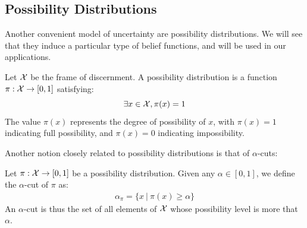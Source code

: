 \subsection{Possibility Distributions}\label{sec:possibilities}
Another convenient model of uncertainty are possibility distributions. We will see that they induce a particular type of belief functions, and will be used in our applications.

\begin{definition}\label{def:possibility}
    Let $\mathcal{X}$ be the frame of discernment. A possibility distribution is a function $\pi: \mathcal{X} \rightarrow [0,1]$ satisfying:
    \begin{equation}
    	\exists x \in \mathcal{X}, \pi(x) = 1 \label{eq:possibility}
    \end{equation}
    The value $\pi(x)$ represents the degree of possibility of $x$, with $\pi(x) = 1$ indicating full possibility, and $\pi(x) = 0$ indicating impossibility.
\end{definition}

Another notion closely related to possibility distributions is that of \(\alpha\)-cuts:
\begin{definition}\label{def:alpha_cut}
    Let $\pi: \mathcal{X} \rightarrow [0,1]$ be a possibility distribution. Given any \(\alpha\in[0,1]\), we define the \(\alpha\)-cut of \(\pi\) as:
    \begin{align}
        \alpha_\pi=\{x~|~\pi(x)\geqslant\alpha\} \label{eq:alpha_cut}   
    \end{align}
    An \(\alpha\)-cut is thus the set of all elements of $\mathcal{X}$ whose possibility level is more that $\alpha$.
\end{definition}

